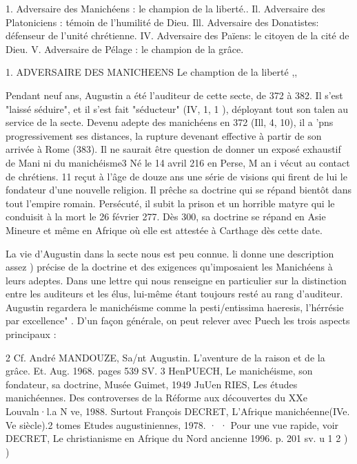 1. Adversaire des Manichéens : le champion de la liberté..
Il. Adversaire des Platoniciens : témoin de l'humilité de Dieu. Ill. Adversaire des Donatistes: défenseur de l'unité chrétienne.
IV.	Adversaire des Païens: le citoyen de la cité de Dieu.
V.	Adversaire de Pélage : le champion de la grâce.


1.	ADVERSAIRE DES MANICHEENS
Le chamption de la liberté	,,


Pendant neuf ans, Augustin a été l'auditeur de cette secte, de 372 à 382. Il s'est "laissé séduire", et il s'est fait "séducteur" (IV, 1, 1 ), déployant tout son talen au service de la secte. Devenu adepte des manichéens en 372 (Ill, 4, 10), il a 'pns progressivement ses distances, la rupture devenant effective à partir de son arrivée à Rome (383). Il ne saurait être question de donner un exposé exhaustif de Mani ni du manichéisme3   Né le 14 avril 216 en Perse, M an i vécut au contact de chrétiens. 11 reçut à l'âge de douze ans une série de visions qui firent de lui le fondateur d'une nouvelle religion. Il prêche sa doctrine qui se répand bientôt dans tout l'empire romain. Persécuté, il subit la prison et un horrible matyre qui le conduisit à la mort le 26 février 277. Dès 300, sa doctrine se répand en Asie Mineure et même en Afrique où elle est attestée à Carthage dès cette date.

La vie d'Augustin dans la secte nous est peu connue. li donne une description assez
)	précise de la doctrine	et	des exigences qu'imposaient les Manichéens à leurs adeptes. Dans une lettre qui nous renseigne en particulier sur la distinction entre les
auditeurs et les élus, lui-même étant toujours resté au rang d'auditeur. Augustin regardera le manichéisme comme la pesti/entissima haeresis, l'hérrésie par excellence" . D'un façon générale, on peut relever avec Puech les trois aspects principaux :




2 Cf. André MANDOUZE, Sa/nt Augustin. L'aventure de la raison et de la grâce. Et. Aug. 1968. pages
539 SV.
3 HenPUECH, Le manichéisme, son fondateur, sa doctrine, Musée Guimet, 1949	JuUen
RIES, Les études manichéennes. Des controverses de la Réforme aux découvertes du XXe
Louvaln·l.a N ve, 1988.   Surtout François DECRET, L'Afrique manichéenne(IVe. Ve siècle).2 tomes Etudes augustiniennes, 1978.	· ·
 	Pour une vue rapide, voir DECRET, Le christianisme en Afrique du Nord ancienne
1996. p. 201 sv.	 	u	1
2
)	)
 
